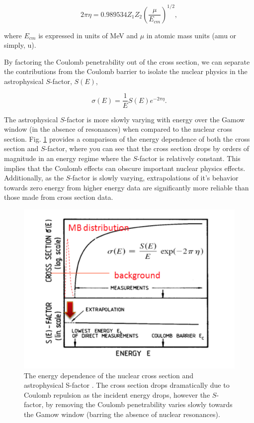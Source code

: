 \begin{equation}
2\pi \eta = 0.989534 Z_{1} Z_{2} \left( \dfrac{\mu}{E_{cm}} \right)^{1/2}, 
\label{eqn: gamow factor}
\end{equation}

\noindent where $E_{cm}$ is expressed in units of MeV and $\mu$ in atomic mass units (amu or simply, u). 

By factoring the Coulomb penetrability out of the cross section, we can separate the contributions from the Coulomb barrier to isolate the nuclear physics in the astrophysical $S$-factor, $S(E)$, 

\begin{equation}
\sigma(E) = \dfrac{1}{E} S(E) e^{-2\pi \eta}.
\label{eqn: s-factor definition}
\end{equation}

\noindent The astrophysical $S$-factor is more slowly varying with energy over the Gamow window (in the absence of resonances) when compared to the nuclear cross section. Fig. \ref{fig: energy dependence} provides a comparison of the energy dependence of both the cross section and $S$-factor, where you can see that the cross section drops by orders of magnitude in an energy regime where the $S$-factor is relatively constant. This implies that the Coulomb effects can obscure important nuclear physics effects. Additionally, as the $S$-factor is slowly varying, extrapolations of it's behavior towards zero energy from higher energy data are significantly more reliable than those made from cross section data. 

\begin{figure}
\includegraphics[width=\linewidth]{figures/crossSectionDependence.png}
\caption{The energy dependence of the nuclear cross section and astrophysical S-factor \cite{RolfsBook}. The cross section drops dramatically due to Coulomb repulsion as the incident energy drops, however the $S$-factor, by removing the Coulomb penetrability varies slowly towards the Gamow window (barring the absence of nuclear resonances). }
\label{fig: energy dependence}
\end{figure}

